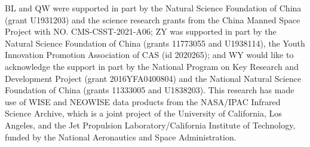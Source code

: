 \documentclass[linenumbers]{aastex631}
\newcommand{\maxi}{{\small \it MAXI}}
\newcommand{\uvot}{{\small {\it Swift}/UVOT}}
\begin{document}
\begin{acknowledgments}
BL and QW were supported in part by the Natural Science Foundation of China (grant U1931203) and the science research grants from the China Manned Space Project with NO. CMS-CSST-2021-A06; ZY was supported in part by the Natural Science Foundation of China (grants 11773055 and U1938114), the Youth Innovation Promotion Association of CAS (id 2020265); and WY would like to acknowledge the support in part by the National Program on Key Research and Development Project (grant 2016YFA0400804) and the National Natural Science Foundation of China (grants 11333005 and U1838203).
This research has made use of WISE and NEOWISE data products from the NASA/IPAC Infrared Science Archive, which is a joint project of the University of California, Los Angeles, and the Jet Propulsion Laboratory/California Institute of Technology, funded by the National Aeronautics and Space Administration. 


\end{acknowledgments}

%



\facilities{\textit{WISE}, \uvot\,, ASAS-SN}%


\end{document}
